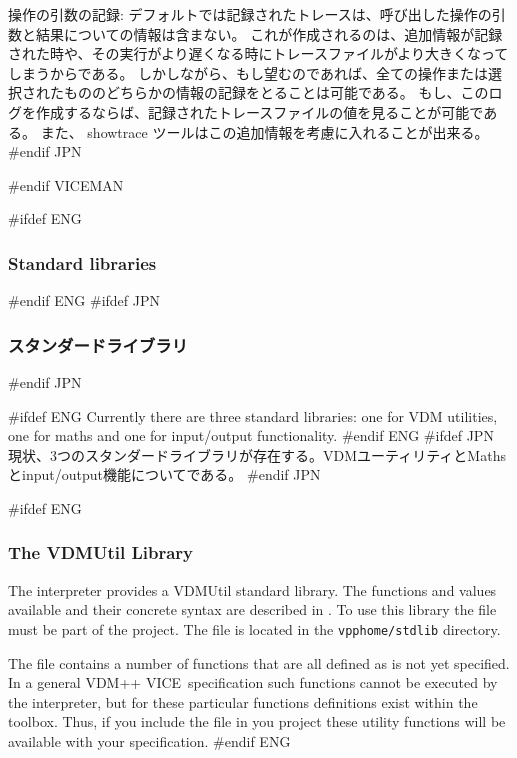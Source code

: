 \documentclass[\pformat,12pt]{article}
\newcommand{\vdmslpp}{VDM-SL}
\newcommand{\vdmslpp}{VDM++}
\renewcommand{\vdmslpp}{VDM++ VICE}
\newcommand{\keyw}[1]{{\sf #1}}
\begin{document}
\begin{list}{}{}
\item[{\sf 操作の引数の記録}:] デフォルトでは記録されたトレースは、呼び出した操作の引数と結果についての情報は含まない。
これが作成されるのは、追加情報が記録された時や、その実行がより遅くなる時にトレースファイルがより大きくなってしまうからである。
しかしながら、もし望むのであれば、全ての操作または選択されたもののどちらかの情報の記録をとることは可能である。
もし、このログを作成するならば、記録されたトレースファイルの値を見ることが可能である。
また、 {\sf showtrace} ツールはこの追加情報を考慮に入れることが出来る。
#endif JPN
\end{list}



#endif VICEMAN


#ifdef ENG
\subsubsection{Standard libraries}\label{subsec:standardlib}
#endif ENG
#ifdef JPN
\subsubsection{スタンダードライブラリ}\label{subsec:standardlib}
#endif JPN

#ifdef ENG
Currently there are three standard libraries: one for VDM utilities, 
one for maths and one
for input/output functionality.
#endif ENG
#ifdef JPN
現状、3つのスタンダードライブラリが存在する。VDMユーティリティとMathsとinput/output機能についてである。
#endif JPN

#ifdef ENG
\subsubsection*{The VDMUtil Library}
The interpreter provides a VDMUtil standard library. The functions and
values available and their concrete syntax are described in
\cite{LangMan-SCSK}. To use this library the file
must be part of the project. 
The file is located in the 
{{\tt vpphome/stdlib}} directory.

The  
file contains a number of functions that are all defined as \keyw{is not yet specified}. 
In a general \vdmslpp\ specification such functions cannot be executed by the interpreter, 
but for these particular functions definitions
exist within the toolbox.  Thus, if you include the
file in you project these utility functions will be available with your specification.
#endif ENG
\end{document}
